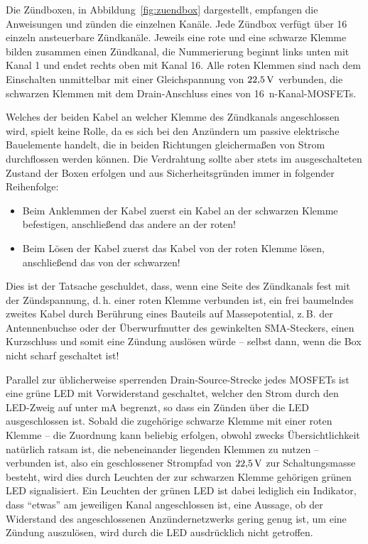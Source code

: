 \documentclass[pdftex, parskip, numbers=noenddot, toc=listof]{scrbook}
\begin{document}
			Die Zündboxen, in Abbildung~\ref{fig:zuendbox} dargestellt, empfangen die Anweisungen und zünden die einzelnen Kanäle. Jede Zündbox verfügt über 16 einzeln ansteuerbare Zündkanäle. Jeweils eine rote und eine schwarze Klemme bilden zusammen einen Zündkanal, die Nummerierung beginnt links unten mit Kanal 1 und endet rechts oben mit Kanal 16. Alle roten Klemmen sind nach dem Einschalten unmittelbar mit einer Gleichspannung von $\unit[22{,}5]{V}$ verbunden, die schwarzen Klemmen mit dem Drain-Anschluss eines von 16~n-Kanal-MOSFETs.

			Welches der beiden Kabel an welcher Klemme des Zündkanals angeschlossen wird, spielt keine Rolle, da es sich bei den Anzündern um passive elektrische Bauelemente handelt, die in beiden Richtungen gleichermaßen von Strom durchflossen werden können. Die Verdrahtung sollte aber stets im ausgeschalteten Zustand der Boxen erfolgen und aus Sicherheitsgründen immer in folgender Reihenfolge:
			\begin{itemize}
				\item Beim Anklemmen der Kabel zuerst ein Kabel an der schwarzen Klemme befestigen, anschließend das andere an der roten!
				\item Beim Lösen der Kabel zuerst das Kabel von der roten Klemme lösen, anschließend das von der schwarzen!
			\end{itemize}
			Dies ist der Tatsache geschuldet, dass, wenn eine Seite des Zündkanals fest mit der Zündspannung, d.\,h. einer roten Klemme verbunden ist, ein frei baumelndes zweites Kabel durch Berührung eines Bauteils auf Massepotential, z.\,B. der Antennenbuchse oder der Überwurfmutter des gewinkelten SMA-Steckers, einen Kurzschluss und somit eine Zündung auslösen würde -- selbst dann, wenn die Box nicht scharf geschaltet ist!

			Parallel zur üblicherweise sperrenden Drain-Source-Strecke jedes MOSFETs ist eine grüne LED mit Vorwiderstand geschaltet, welcher den Strom durch den LED-Zweig auf unter \unit[5]{mA} begrenzt, so dass ein Zünden über die LED ausgeschlossen ist. Sobald die zugehörige schwarze Klemme mit einer roten Klemme -- die Zuordnung kann beliebig erfolgen, obwohl zwecks Übersichtlichkeit natürlich ratsam ist, die nebeneinander liegenden Klemmen zu nutzen -- verbunden ist, also ein geschlossener Strompfad von $\unit[22{,}5]{V}$ zur Schaltungsmasse besteht, wird dies durch Leuchten der zur schwarzen Klemme gehörigen grünen LED signalisiert. Ein Leuchten der grünen LED ist dabei lediglich ein Indikator, dass \enquote{etwas} am jeweiligen Kanal angeschlossen ist, eine Aussage, ob der Widerstand des angeschlossenen Anzündernetzwerks gering genug ist, um eine Zündung auszulösen, wird durch die LED ausdrücklich nicht getroffen.
\end{document}
